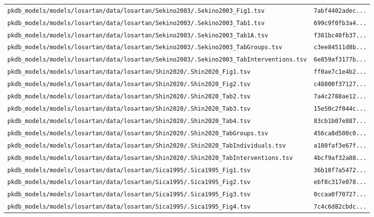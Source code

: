 \begin{longtable}{ll}
\texttt{pkdb\_models/models/losartan/data/losartan/Sekino2003/.Sekino2003\_Fig1.tsv} & \texttt{7abf4402adec...} \\
\texttt{pkdb\_models/models/losartan/data/losartan/Sekino2003/.Sekino2003\_Tab1.tsv} & \texttt{699c9f0fb3a4...} \\
\texttt{pkdb\_models/models/losartan/data/losartan/Sekino2003/.Sekino2003\_Tab1A.tsv} & \texttt{f381bc40fb37...} \\
\texttt{pkdb\_models/models/losartan/data/losartan/Sekino2003/.Sekino2003\_TabGroups.tsv} & \texttt{c3ee84511d8b...} \\
\texttt{pkdb\_models/models/losartan/data/losartan/Sekino2003/.Sekino2003\_TabInterventions.tsv} & \texttt{6e859af3177b...} \\
\texttt{pkdb\_models/models/losartan/data/losartan/Shin2020/.Shin2020\_Fig1.tsv} & \texttt{ff0ae7c1e4b2...} \\
\texttt{pkdb\_models/models/losartan/data/losartan/Shin2020/.Shin2020\_Fig2.tsv} & \texttt{c48800f37127...} \\
\texttt{pkdb\_models/models/losartan/data/losartan/Shin2020/.Shin2020\_Tab2.tsv} & \texttt{7a4c2788ae12...} \\
\texttt{pkdb\_models/models/losartan/data/losartan/Shin2020/.Shin2020\_Tab3.tsv} & \texttt{15e50c2f044c...} \\
\texttt{pkdb\_models/models/losartan/data/losartan/Shin2020/.Shin2020\_Tab4.tsv} & \texttt{83cb1b07e887...} \\
\texttt{pkdb\_models/models/losartan/data/losartan/Shin2020/.Shin2020\_TabGroups.tsv} & \texttt{456ca8d500c0...} \\
\texttt{pkdb\_models/models/losartan/data/losartan/Shin2020/.Shin2020\_TabIndividuals.tsv} & \texttt{a180faf3e67f...} \\
\texttt{pkdb\_models/models/losartan/data/losartan/Shin2020/.Shin2020\_TabInterventions.tsv} & \texttt{4bcf9af32a88...} \\
\texttt{pkdb\_models/models/losartan/data/losartan/Sica1995/.Sica1995\_Fig1.tsv} & \texttt{36b10f7a5472...} \\
\texttt{pkdb\_models/models/losartan/data/losartan/Sica1995/.Sica1995\_Fig2.tsv} & \texttt{ebf8c317e078...} \\
\texttt{pkdb\_models/models/losartan/data/losartan/Sica1995/.Sica1995\_Fig3.tsv} & \texttt{0ccaa0f70727...} \\
\texttt{pkdb\_models/models/losartan/data/losartan/Sica1995/.Sica1995\_Fig4.tsv} & \texttt{7c4c6d82cbdc...} \\

\end{longtable}
